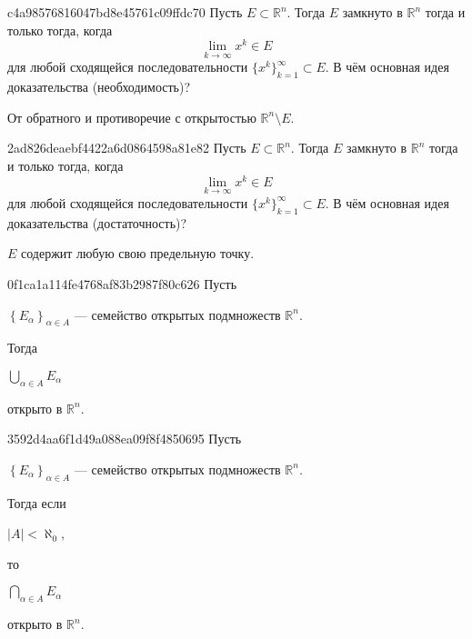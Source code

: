 \begin{note}{c4a98576816047bd8e45761c09ffdc70}
    Пусть \({ E \subset \mathbb R^{n} }\).
    Тогда \({ E }\) замкнуто в \({ \mathbb R^{n} }\) тогда и только тогда, когда
    \[
        \lim_{k \to \infty} x^{k} \in E
    \]
    для любой сходящейся последовательности \({ \{ x^{k} \}_{k = 1}^{\infty} \subset E }\).
    В чём основная идея доказательства (необходимость)?

    \begin{cloze}{1}
        От обратного и противоречие с открытостью \({ \mathbb R^{n} \setminus E }\).
    \end{cloze}
\end{note}

\begin{note}{2ad826deaebf4422a6d0864598a81e82}
    Пусть \({ E \subset \mathbb R^{n} }\).
    Тогда \({ E }\) замкнуто в \({ \mathbb R^{n} }\) тогда и только тогда, когда
    \[
        \lim_{k \to \infty} x^{k} \in E
    \]
    для любой сходящейся последовательности \({ \{ x^{k} \}_{k = 1}^{\infty} \subset E }\).
    В чём основная идея доказательства (достаточность)?

    \begin{cloze}{1}
        \({ E }\) содержит любую свою предельную точку.
    \end{cloze}
\end{note}

\begin{note}{0f1ca1a114fe4768af83b2987f80c626}
    Пусть \begin{icloze}{3}\({ \left\{ E_\alpha \right\}_{\alpha \in A} }\) --- семейство открытых подмножеств \({ \mathbb R^{n} }\).\end{icloze}
    Тогда \begin{icloze}{2}\({ \displaystyle \bigcup_{\alpha \in A}^{} E_\alpha }\)\end{icloze} \begin{icloze}{1}открыто в \({ \mathbb R^{n} }\).\end{icloze}
\end{note}

\begin{note}{3592d4aa6f1d49a088ea09f8f4850695}
    Пусть \begin{icloze}{4}\({ \left\{ E_\alpha \right\}_{\alpha \in A} }\) --- семейство открытых подмножеств \({ \mathbb R^{n} }\).\end{icloze}
    Тогда если \begin{icloze}{3}\({ \left\lvert A \right\rvert < \aleph_0 }\),\end{icloze} то \begin{icloze}{2}\({ \displaystyle \bigcap_{\alpha \in A}^{} E_\alpha }\)\end{icloze} \begin{icloze}{1}открыто в \({ \mathbb R^{n} }\).\end{icloze}
\end{note}


